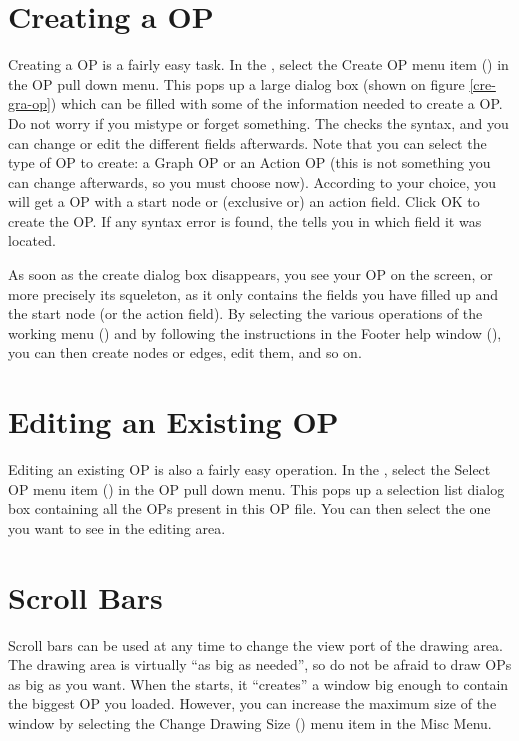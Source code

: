 \section{Creating a OP}

Creating a OP is a fairly easy task. In the \OPE{}, select the Create OP menu
item () in the OP pull down menu. This pops up a large dialog
box (shown on figure \ref{cre-gra-op}) which can be filled with some of the
information needed to create a OP.  Do not worry if you mistype or forget
something. The \OPE{} checks the syntax, and you can change or edit the
different fields afterwards. Note that you can select the type of OP to create:
a Graph OP or an Action OP (this is not something you can change afterwards, so
you must choose now). According to your choice, you will get a OP with a start
node or (exclusive or) an action field. Click OK to create the OP. If any
syntax error is found, the \OPE{} tells you in which field it was located.

As soon as the create dialog box disappears, you see your OP on the screen,
or more precisely its squeleton, as it only contains the fields you
have filled up and the start node (or the action field). By selecting
the various operations of the working menu () and by following the instructions in the Footer help window
(), you can then create nodes or
edges, edit them, and so on.

\section{Editing an Existing OP}

Editing an existing OP is also a fairly easy operation. In the \OPE{},
select the Select OP menu item () in the OP pull down
menu. This pops up a selection list dialog box containing all the OPs
present in this OP file. You can then select the one you want to see in
the editing area.

\section{Scroll Bars}

Scroll bars can be used at any time to change the view port of the drawing
area. The drawing area is virtually ``as big as needed'', so do not be afraid
to draw OPs as big as you want. When the \OPE{} starts, it ``creates'' a window
big enough to contain the biggest OP you loaded.  However, you can increase the
maximum size of the window by selecting the Change Drawing Size () menu item in the Misc Menu.

